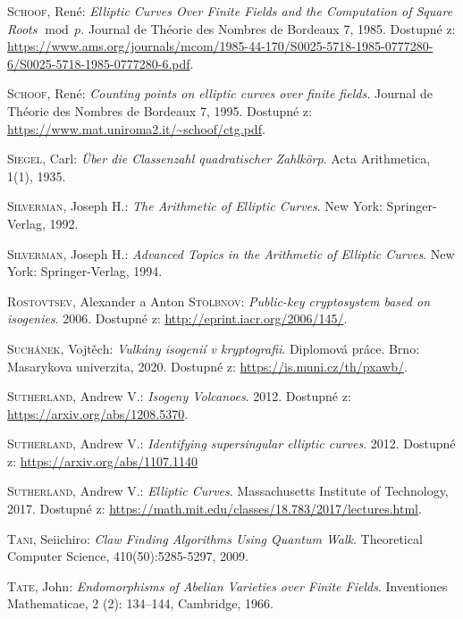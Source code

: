 \documentclass[12pt]{report}
\begin{document}
\begin{thebibliography}{97}
\textsc{Schoof}, René: \textit{Elliptic Curves Over Finite Fields and the Computation of Square Roots $\! \operatorname{mod} \, p$.} Journal de Théorie des Nombres de Bordeaux 7, 1985. Dostupné z: \url{https://www.ams.org/journals/mcom/1985-44-170/S0025-5718-1985-0777280-6/S0025-5718-1985-0777280-6.pdf}.

\textsc{Schoof}, René: \textit{Counting points on elliptic curves over finite fields.} Journal de Théorie des Nombres de Bordeaux 7, 1995. Dostupné z: \url{https://www.mat.uniroma2.it/~schoof/ctg.pdf}.

\textsc{Siegel}, Carl: \textit{Über die Classenzahl quadratischer Zahlkörp}. Acta Arithmetica, 1(1), 1935.

\textsc{Silverman}, Joseph H.: \textit{The Arithmetic of Elliptic Curves}. New York: Springer-Verlag, 1992. 

\textsc{Silverman}, Joseph H.: \textit{Advanced Topics in the Arithmetic of Elliptic Curves}. New York: Springer-Verlag, 1994. 

\textsc{Rostovtsev}, Alexander a Anton \textsc{Stolbnov}:\textit{ Public-key cryptosystem based on isogenies}. 2006. Dostupné z: \url{http://eprint.iacr.org/2006/145/}. 


\textsc{Suchánek}, Vojtěch: \textit{Vulkány isogenií v kryptografii}. Diplomová práce. Brno: Masarykova univerzita, 2020. Dostupné z: \url{https://is.muni.cz/th/pxawb/}.

\textsc{Sutherland}, Andrew V.: \textit{Isogeny Volcanoes}. 2012. Dostupné z: \url{https://arxiv.org/abs/1208.5370}.

\textsc{Sutherland}, Andrew V.: \textit{Identifying supersingular elliptic curves}. 2012. Dostupné z: \url{https://arxiv.org/abs/1107.1140}

\textsc{Sutherland}, Andrew V.: \textit{Elliptic Curves}. Massachusetts Institute of Technology, 2017. Dostupné z: \url{https://math.mit.edu/classes/18.783/2017/lectures.html}. 

\textsc{Tani}, Seiichiro: \textit{Claw Finding Algorithms Using Quantum Walk}. Theoretical Computer Science, 410(50):5285-5297, 2009.

\textsc{Tate}, John: \textit{Endomorphisms of Abelian Varieties over Finite Fields}. Inventiones Mathematicae, 2 (2): 134–144, Cambridge, 1966.


\end{thebibliography}
\end{document}
